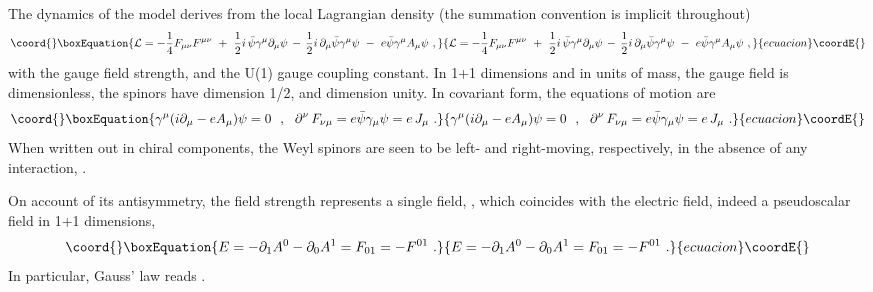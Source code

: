 \documentclass[a4paper,11pt]{article}
\begin{document}
The dynamics of the model derives from the local Lagrangian density
(the summation convention is implicit throughout)
\begin{equation}\coord{}\boxEquation{
{\cal L}=-\frac{1}{4}F_{\mu\nu}F^{\mu\nu}\ +\
\frac{1}{2}i\,\bar{\psi}\gamma^\mu\partial_\mu\psi\,-\,
\frac{1}{2}i\,\partial_\mu\bar{\psi}\gamma^\mu\psi\ -\
e\bar{\psi}\gamma^\mu A_\mu\psi\ ,
}{
{\cal L}=-\frac{1}{4}F_{\mu\nu}F^{\mu\nu}\ +\
\frac{1}{2}i\,\bar{\psi}\gamma^\mu\partial_\mu\psi\,-\,
\frac{1}{2}i\,\partial_\mu\bar{\psi}\gamma^\mu\psi\ -\
e\bar{\psi}\gamma^\mu A_\mu\psi\ ,
}{ecuacion}\coordE{}\end{equation}
with \coordHE{} the gauge field 
strength, and \myHighlight{$e$}\coordHE{} the U(1) gauge coupling constant. In 1+1 dimensions and 
in units of mass, the gauge field \coordHE{} is dimensionless, the spinors 
\myHighlight{$\psi_\pm$}\coordHE{} have dimension 1/2, and \coordHE{} dimension unity. In covariant form, 
the equations of motion are
\begin{equation}\coord{}\boxEquation{
\gamma^\mu(i\partial_\mu-eA_\mu)\psi=0\ \ ,\ \ 
\partial^\nu\,F_{\nu\mu}=e\bar{\psi}\gamma_\mu\psi=e\,J_\mu\ .
}{
\gamma^\mu(i\partial_\mu-eA_\mu)\psi=0\ \ ,\ \ 
\partial^\nu\,F_{\nu\mu}=e\bar{\psi}\gamma_\mu\psi=e\,J_\mu\ .
}{ecuacion}\coordE{}\end{equation} 
When written out in chiral components, the Weyl spinors
\myHighlight{$\psi_\pm(t\pm x)$}\coordHE{} are seen to be left- and right-moving, respectively,
in the absence of any interaction, \coordHE{}.

On account of its antisymmetry, the field strength \coordHE{} represents 
a single field, \coordHE{}, which coincides with the electric field, indeed
a pseudoscalar field in 1+1 dimensions,
\begin{equation}\coord{}\boxEquation{
E=-\partial_1A^0-\partial_0A^1=F_{01}=-F^{01}\ .
}{
E=-\partial_1A^0-\partial_0A^1=F_{01}=-F^{01}\ .
}{ecuacion}\coordE{}\end{equation}
In particular, Gauss' law reads \coordHE{}.
\end{document}
